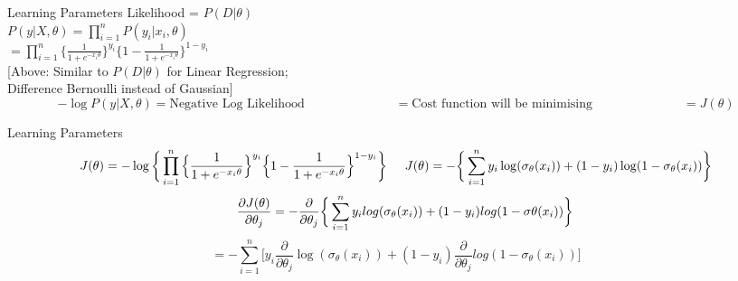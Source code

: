 \documentclass{beamer}
\begin{document}
	\begin{frame}{Learning Parameters}
	    Likelihood = $P(D | \theta)$ \\
	    \vspace{0.2cm}
	    $P(y | X, \theta) = \prod_{i=1}^{n} P(y_{i} | x_{i}, \theta)$ \\
	    \vspace{0.2cm}
	    \hspace{1.55cm} $ = \prod_{i=1}^{n} \Big\{\frac{1}{1 + e^{-x_{i}\theta}}\Big\}^{y_{i}}\Big\{1 - \frac{1}{1 + e^{-x_{i}\theta}}\Big\}^{1 - y_{i}}$ \\
	    \vspace{0.2cm}
	    [Above: Similar to $P(D|\theta)$ for Linear Regression; \\
	    \hspace{1.3cm} Difference Bernoulli instead of Gaussian]\\
	    \begin{equation*}
	        -\log P(y | X, \theta) = \text{Negative Log Likelihood}
	        \hspace{3cm} = \text{Cost function will be minimising} 
	        \hspace{3cm} = J(\theta)
	    \end{equation*}
	\end{frame}
	\begin{frame}{Learning Parameters}
	    \begin{equation*}
	        J(\theta) = -\log \bigg\{\prod_{i=1}^{n} \Big\{\frac{1}{1 + e^{-x_{i}\theta}}\Big\}^{y_{i}}\Big\{1 - \frac{1}{1 + e^{-x_{i}\theta}}\Big\}^{1 - y_{i}}\bigg\}
	        \hspace{0.5cm} J(\theta) = -\bigg\{\sum_{i=1}^{n} y_{i} \log(\sigma_{\theta}(x_{i})) + (1 - y_{i})\log(1 - \sigma_{\theta}(x_{i}))\bigg\} 
	    \end{equation*}
	    \begin{equation*}
	        \hspace{0.5cm} \frac{\partial J(\theta)}{\partial \theta_{j}} = -\frac{\partial }{\partial \theta_{j}} \bigg\{\sum_{i=1}^{n} y_{i} log(\sigma_{\theta}(x_{i})) + (1 - y_{i})log(1 - \sigma{\theta}(x_{i}))\bigg\}
	    \end{equation*}
	    \begin{equation*}
	        = -\sum_{i=1}^{n}\bigg[y_{i}\frac{\partial}{\partial \theta_{j}} \log(\sigma_{\theta}(x_{i})) + (1-y_{i})\frac{\partial}{\partial \theta_{j}} log(1 - \sigma_{\theta}(x_{i}))\bigg]
	    \end{equation*}
	\end{frame}
\end{document}
